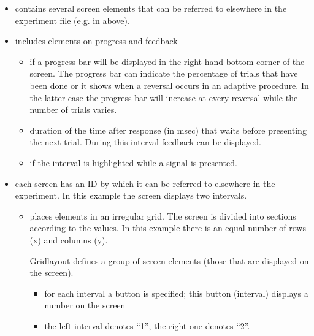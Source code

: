 \begin{itemize}
\item {} contains several screen elements that can
be referred to elsewhere in the experiment file (e.g. in
 above).


\item {} includes elements on progress and
feedback

\begin{itemize}

\item {} if  a progress bar will be
displayed in the right hand bottom corner of the screen. The
progress bar can indicate the percentage of trials that have been done or it
shows when a reversal occurs in an adaptive procedure. In the
latter case the progress bar will increase at every reversal while
the number of trials varies.

\item {} duration of the time after
response (in msec) that \apex waits before presenting the next
trial. During this interval feedback can be displayed.

\item {} if  the interval is highlighted while a
signal is presented.
\end{itemize}

\item {} each screen has an ID by which it can be
referred to elsewhere in the experiment. In this example the
screen displays two intervals.

\begin{itemize}


\item {}places elements in an irregular grid.
The screen is divided into sections according to the values. In
this example there is an equal number of rows (x) and columns (y).

Gridlayout defines a group of screen elements (those that are
displayed on the screen).

\begin{itemize}
\item {} for each interval a button is specified;
this button (interval) displays a number on the screen

\item {} the left interval denotes ``1'', the right
one denotes ``2''.


\end{itemize}
\end{itemize}
\end{itemize}
